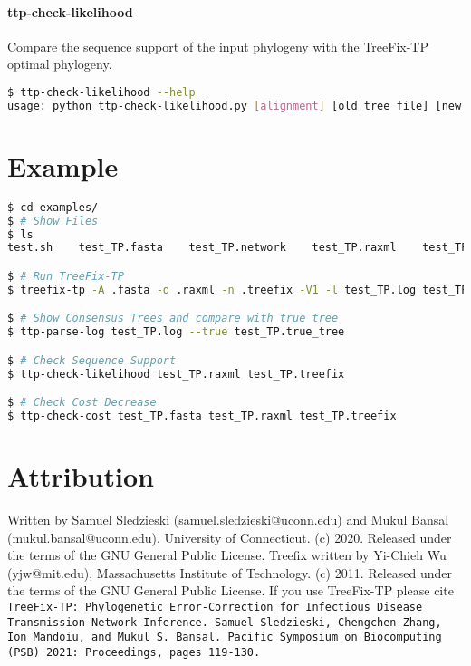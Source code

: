 \documentclass[11pt]{article}
\begin{document}
\paragraph{ttp-check-likelihood}
Compare the sequence support of the input phylogeny with the TreeFix-TP optimal phylogeny.

\begin{lstlisting}[language=Bash]
$ ttp-check-likelihood --help
usage: python ttp-check-likelihood.py [alignment] [old tree file] [new tree file]
\end{lstlisting}
\vspace{2mm}

\section{Example}

\begin{lstlisting}[language=Bash]
$ cd examples/
$ # Show Files
$ ls
test.sh    test_TP.fasta    test_TP.network    test_TP.raxml    test_TP.true_tree

$ # Run TreeFix-TP
$ treefix-tp -A .fasta -o .raxml -n .treefix -V1 -l test_TP.log test_TP.raxml

$ # Show Consensus Trees and compare with true tree
$ ttp-parse-log test_TP.log --true test_TP.true_tree

$ # Check Sequence Support
$ ttp-check-likelihood test_TP.raxml test_TP.treefix

$ # Check Cost Decrease
$ ttp-check-cost test_TP.fasta test_TP.raxml test_TP.treefix
\end{lstlisting}
\vspace{2mm}

\section*{Attribution}
Written by Samuel Sledzieski (samuel.sledzieski@uconn.edu) and Mukul Bansal
(mukul.bansal@uconn.edu), University of Connecticut. (c) 2020. Released under
the terms of the GNU General Public License.
Treefix written by Yi-Chieh Wu (yjw@mit.edu), Massachusetts Institute of
Technology. (c) 2011. Released under the terms of the GNU General Public
License. If you use TreeFix-TP please cite\\
\texttt{TreeFix-TP: Phylogenetic Error-Correction for Infectious Disease Transmission Network Inference. Samuel Sledzieski, Chengchen Zhang, Ion Mandoiu, and Mukul S. Bansal. Pacific Symposium on Biocomputing (PSB) 2021: Proceedings, pages 119-130.}
\end{document}
